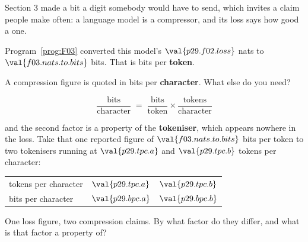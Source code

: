 \begin{fr}
Section 3 made a bit a digit somebody would have to send, which invites a
claim people make often: a language model is a compressor, and its loss says
how good a one.

Program~\ref{prog:F03} converted this model's $\val{p29.f02.loss}$ nats to
$\val{f03.nats.to.bits}$ bits. That is bits per \textbf{token}.

A compression figure is quoted in bits per \textbf{character}. What else do
you need?
\dotline
\nextframe
\end{fr}

\begin{fr}

\[ \frac{\text{bits}}{\text{character}}
   \;=\; \frac{\text{bits}}{\text{token}}
   \times \frac{\text{tokens}}{\text{character}} \]

and the second factor is a property of the \textbf{tokeniser}, which appears
nowhere in the loss. Take that one reported figure of
$\val{f03.nats.to.bits}$ bits per token to two tokenisers running at
$\val{p29.tpc.a}$ and $\val{p29.tpc.b}$ tokens per character:

\begin{center}
\begin{tabular}{lcc}
\toprule
tokens per character & $\val{p29.tpc.a}$ & $\val{p29.tpc.b}$ \\
bits per character & $\val{p29.bpc.a}$ & $\val{p29.bpc.b}$ \\
\bottomrule
\end{tabular}
\end{center}

One loss figure, two compression claims. By what factor do they differ, and
what is that factor a property of?
\dotline
\nextframe
\end{fr}

